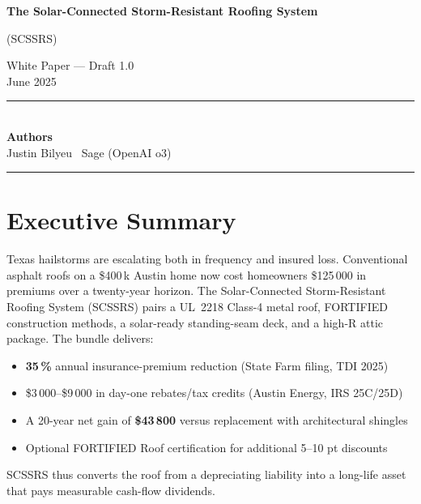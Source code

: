\documentclass[11pt]{article}
\begin{document}
\begin{titlepage}
    \centering
    {\huge\bfseries The Solar-Connected Storm-Resistant Roofing System\par}
    \vspace{0.5cm}
    {\Large (SCSSRS)\par}
    \vfill
    {\large White Paper — Draft 1.0}\\
    {\large June 2025}\\
    \vspace{1cm}
    \rule{\textwidth}{0.4pt}\\
    \textbf{Authors}\\
    Justin Bilyeu \textbar\  Sage (OpenAI o3)\\
    \rule{\textwidth}{0.4pt}
\end{titlepage}

\section*{Executive Summary}

\noindent
Texas hailstorms are escalating both in frequency and insured loss.
Conventional asphalt roofs on a \$400\,k Austin home now cost homeowners
\$125\,000 in premiums over a twenty-year horizon.
The Solar-Connected Storm-Resistant Roofing System (SCSSRS) pairs a
UL~2218 Class-4 metal roof, FORTIFIED\textsuperscript{\texttrademark}
construction methods, a solar-ready standing-seam deck, and a
high-R attic package.  The bundle delivers:
\begin{itemize}
    \item \textbf{35\,\%} annual insurance-premium reduction
          (State Farm filing, TDI 2025)
    \item \$3\,000–\$9\,000 in day-one rebates/tax credits
          (Austin Energy, IRS 25C/25D)
    \item A 20-year net gain of \textbf{\$43\,800} versus replacement
          with architectural shingles
    \item Optional FORTIFIED Roof\textsuperscript{\texttrademark}
          certification for additional 5–10 pt discounts
\end{itemize}

\noindent
SCSSRS thus converts the roof from a depreciating liability into a
long-life asset that pays measurable cash-flow dividends.
\end{document}
